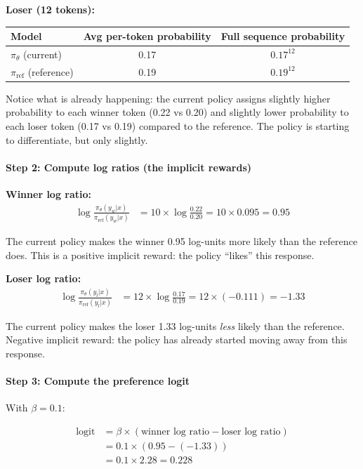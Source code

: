 \begin{chapterenv}
\textbf{Loser (12 tokens):}

\begin{center}
\begin{tabular}{lcc}
\toprule
\textbf{Model} & \textbf{Avg per-token probability} & \textbf{Full sequence probability} \\
\midrule
$\pi_\theta$ (current) & 0.17 & $0.17^{12}$ \\
$\pi_{\text{ref}}$ (reference) & 0.19 & $0.19^{12}$ \\
\bottomrule
\end{tabular}
\end{center}

Notice what is already happening: the current policy assigns slightly higher probability to each winner token (0.22 vs 0.20) and slightly lower probability to each loser token (0.17 vs 0.19) compared to the reference. The policy is starting to differentiate, but only slightly.

\paragraph{Step 2: Compute log ratios (the implicit rewards)}

\textbf{Winner log ratio:}
\begin{align*}
\log \frac{\pi_\theta(y_w|x)}{\pi_{\text{ref}}(y_w|x)} &= 10 \times \log \frac{0.22}{0.20} = 10 \times 0.095 = 0.95
\end{align*}

The current policy makes the winner 0.95 log-units more likely than the reference does. This is a positive implicit reward: the policy ``likes'' this response.

\textbf{Loser log ratio:}
\begin{align*}
\log \frac{\pi_\theta(y_l|x)}{\pi_{\text{ref}}(y_l|x)} &= 12 \times \log \frac{0.17}{0.19} = 12 \times (-0.111) = -1.33
\end{align*}

The current policy makes the loser 1.33 log-units \textit{less} likely than the reference. Negative implicit reward: the policy has already started moving away from this response.

\paragraph{Step 3: Compute the preference logit}

With $\beta = 0.1$:

\begin{align*}
\text{logit} &= \beta \times \left(\text{winner log ratio} - \text{loser log ratio}\right) \\
&= 0.1 \times \left(0.95 - (-1.33)\right) \\
&= 0.1 \times 2.28 = 0.228
\end{align*}


\end{chapterenv}
